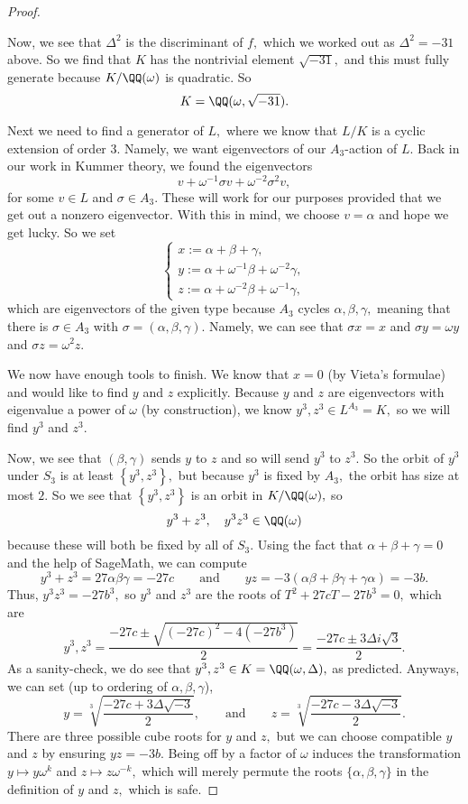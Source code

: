 \begin{proof}
\begin{listroman}
		Now, we see that $\Delta^2$ is the discriminant of $f,$ which we worked out as $\Delta^2=-31$ above. So we find that $K$ has the nontrivial element $\sqrt{-31},$ and this must fully generate because $K/\QQ(\omega)$ is quadratic. So
		\[K=\QQ(\omega,\sqrt{-31}).\]

		\item Next we need to find a generator of $L,$ where we know that $L/K$ is a cyclic extension of order $3.$ Namely, we want eigenvectors of our $A_3$-action of $L.$ Back in our work in Kummer theory, we found the eigenvectors
		\[v+\omega^{-1}\sigma v+\omega^{-2}\sigma^2v,\]
		for some $v\in L$ and $\sigma\in A_3.$ These will work for our purposes provided that we get out a nonzero eigenvector. With this in mind, we choose $v=\alpha$ and hope we get lucky. So we set
		\[\begin{cases}
			x := \alpha+\beta+\gamma, \\
			y := \alpha+\omega^{-1}\beta+\omega^{-2}\gamma, \\
			z := \alpha+\omega^{-2}\beta+\omega^{-1}\gamma,
		\end{cases}\]
		which are eigenvectors of the given type because $A_3$ cycles $\alpha,\beta,\gamma,$ meaning that there is $\sigma\in A_3$ with $\sigma=(\alpha,\beta,\gamma).$ Namely, we can see that $\sigma x=x$ and $\sigma y=\omega y$ and $\sigma z=\omega^2z.$
	\end{listroman}
	We now have enough tools to finish. We know that $x=0$ (by Vieta's formulae) and would like to find $y$ and $z$ explicitly. Because $y$ and $z$ are eigenvectors with eigenvalue a power of $\omega$ (by construction), we know $y^3,z^3\in L^{A_3}=K,$ so we will find $y^3$ and $z^3.$
	
	Now, we see that $(\beta,\gamma)$ sends $y$ to $z$ and so will send $y^3$ to $z^3.$ So the orbit of $y^3$ under $S_3$ is at least $\left\{y^3,z^3\right\},$ but because $y^3$ is fixed by $A_3,$ the orbit has size at most $2.$ So we see that $\left\{y^3,z^3\right\}$ is an orbit in $K/\QQ(\omega),$ so
	\[y^3+z^3,\quad y^3z^3\in\QQ(\omega)\]
	because these will both be fixed by all of $S_3.$ Using the fact that $\alpha+\beta+\gamma=0$ and the help of SageMath, we can compute
	\[y^3+z^3=27\alpha\beta\gamma=-27c\qquad\text{and}\qquad yz=-3(\alpha\beta+\beta\gamma+\gamma\alpha)=-3b.\]
	Thus, $y^3z^3=-27b^3,$ so $y^3$ and $z^3$ are the roots of $T^2+27cT-27b^3=0,$ which are
	\[y^3,z^3=\frac{-27c\pm\sqrt{(-27c)^2-4\left(-27b^3\right)}}2=\frac{-27c\pm3\Delta i\sqrt3}2.\]
	As a sanity-check, we do see that $y^3,z^3\in K=\QQ(\omega,\Delta),$ as predicted. Anyways, we can set (up to ordering of $\alpha,\beta,\gamma$),
	\[y=\sqrt[3]{\frac{-27c+3\Delta\sqrt{-3}}2},\qquad\text{and}\qquad z=\sqrt[3]{\frac{-27c-3\Delta\sqrt{-3}}2}.\]
	There are three possible cube roots for $y$ and $z,$ but we can choose compatible $y$ and $z$ by ensuring $yz=-3b.$ Being off by a factor of $\omega$ induces the transformation $y\mapsto y\omega^k$ and $z\mapsto z\omega^{-k},$ which will merely permute the roots $\{\alpha,\beta,\gamma\}$ in the definition of $y$ and $z,$ which is safe.


\end{proof}
